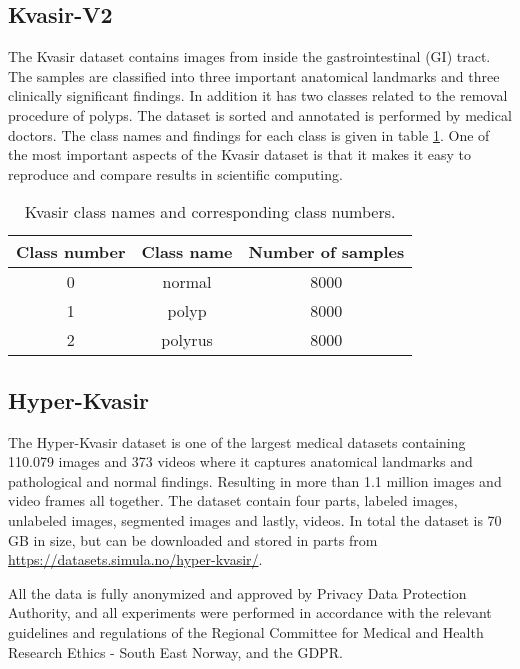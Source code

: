 \documentclass[thesis.tex]{subfiles}
\begin{document}
\subsection{Kvasir-V2} \label{sec:kvasir-v2}
The Kvasir dataset \cite{KVASIRMultiClass17} contains images from inside the gastrointestinal (GI) tract. The samples are classified into three important anatomical landmarks and three clinically significant findings. In addition it has two classes related to the removal procedure of polyps. The dataset is sorted and annotated is performed by medical doctors. The class names and findings for each class is given in table \ref{table:kvasir}. One of the most important aspects of the Kvasir dataset is that it makes it easy to reproduce and compare results in scientific computing.


\begin{table}
  \centering
  \begin{tabular}{ |c|c|c| }
  	\hline
  	Class number & Class name & Number of samples \\
    \hline
    0 & normal & 8000 \\ 
    1 & polyp & 8000 \\ 
    2 & polyrus & 8000 \\ 
    \hline
  \end{tabular}
  \caption{Kvasir class names and corresponding class numbers.}
  \label{table:kvasir}
\end{table}


\subsection{Hyper-Kvasir} \label{sec:hyper_kvasir}
The Hyper-Kvasir dataset \cite{HyperKvasirComprehensive19} is one of the largest medical datasets containing 110.079 images and 373 videos where it captures anatomical landmarks and pathological and normal findings. Resulting in more than 1.1 million images and video frames all together. The dataset contain four parts, labeled images, unlabeled images, segmented images and lastly, videos. In total the dataset is 70 GB in size, but can be downloaded and stored in parts from \url{https://datasets.simula.no/hyper-kvasir/}.

All the data is fully anonymized and approved by Privacy Data Protection Authority, and all experiments were performed in accordance with the relevant guidelines and regulations of the Regional Committee for Medical and Health Research Ethics - South East Norway, and the GDPR.
\end{document}

